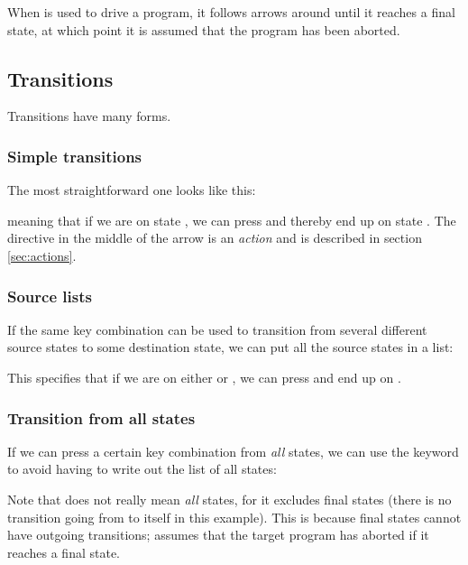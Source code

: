 \documentclass[11pt,a4paper]{article}
\begin{document}
When  is used to drive a program, it follows arrows
around until it reaches a final state, at which point it is assumed
that the program has been aborted.

\subsection{Transitions}

Transitions have many forms.

\subsubsection{Simple transitions}

The most straightforward one looks like this:


meaning that if we are on state , we can press  and
thereby end up on state . The  directive in the
middle of the arrow is an \emph{action} and is described in section
\ref{sec:actions}.

\subsubsection{Source lists}

If the same key combination can be used to transition from several
different source states to some destination state, we can put all the
source states in a list:


This specifies that if we are on either  or
, we can press  and end up on .

\subsubsection{Transition from all states\label{sec:all}}

If we can press a certain key combination from \emph{all} states, we
can use the  keyword to avoid having to write out the list of
all states:


Note that  does not really mean \emph{all} states, for it
excludes final states (there is no transition going from  to
itself in this example). This is because final states cannot have
outgoing transitions;  assumes that the target program
has aborted if it reaches a final state.
\end{document}
